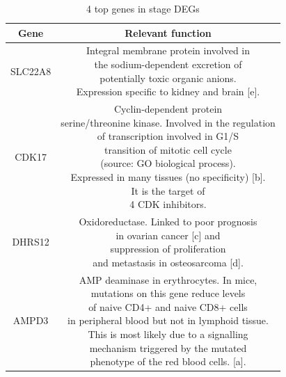 \documentclass[fleqn,10pt]{SelfArx} %
\begin{document}
\begin{table}[ht]
	\small
	\centering
	\begin{tabular}{cc}
		\hline
		Gene & Relevant function\\
		\hline
		SLC22A8 & \makecell{Integral membrane protein involved in\\the sodium-dependent excretion of\\potentially toxic organic anions.\\Expression specific to kidney and brain [e].}\\
		CDK17 & \makecell{Cyclin-dependent protein \\serine/threonine kinase. Involved in the regulation \\of transcription involved in G1/S\\transition of mitotic cell cycle\\(source: GO biological process).\\Expressed in many tissues (no specificity) [b].\\It is the target of\\4 CDK inhibitors.}\\
		DHRS12 & \makecell{Oxidoreductase. Linked to poor prognosis\\in ovarian cancer [c] and\\suppression of proliferation\\and metastasis in osteosarcoma [d].}\\
		AMPD3 & \makecell{AMP deaminase in erythrocytes. In mice,\\mutations on this gene reduce levels\\of naive CD4+ and naive CD8+ cells\\in peripheral blood but not in lymphoid tissue.\\This is most likely due to a signalling\\mechanism triggered by the mutated\\phenotype of the red blood cells. [a].}\\
		\hline
	\end{tabular}
	\caption{4 top genes in stage DEGs}
	\label{tab:deg_char}
\end{table}






\end{document}

